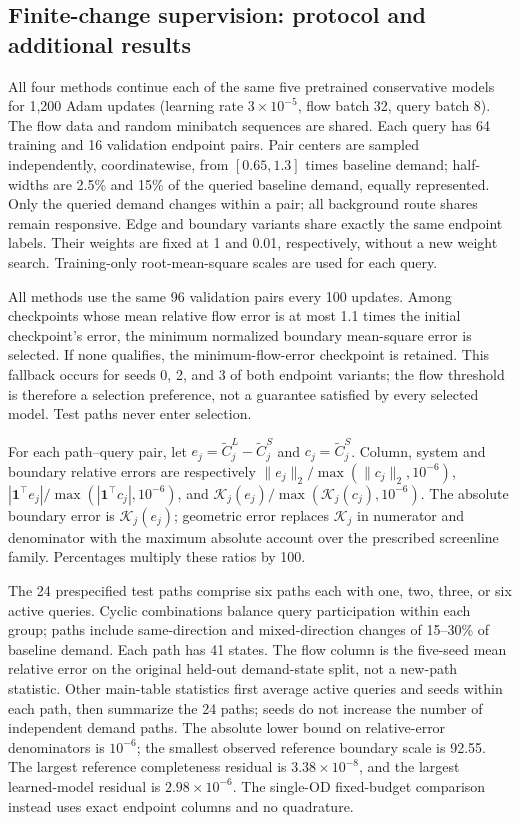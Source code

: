 \subsection{Finite-change supervision: protocol and additional results}\label{app:pairs-v102}
All four methods continue each of the same five pretrained conservative models for 1,200 Adam updates (learning rate $3\times10^{-5}$, flow batch 32, query batch 8). The flow data and random minibatch sequences are shared. Each query has 64 training and 16 validation endpoint pairs. Pair centers are sampled independently, coordinatewise, from $[0.65,1.3]$ times baseline demand; half-widths are 2.5\% and 15\% of the queried baseline demand, equally represented. Only the queried demand changes within a pair; all background route shares remain responsive. Edge and boundary variants share exactly the same endpoint labels. Their weights are fixed at 1 and 0.01, respectively, without a new weight search. Training-only root-mean-square scales are used for each query.

All methods use the same 96 validation pairs every 100 updates. Among checkpoints whose mean relative flow error is at most 1.1 times the initial checkpoint's error, the minimum normalized boundary mean-square error is selected. If none qualifies, the minimum-flow-error checkpoint is retained. This fallback occurs for seeds 0, 2, and 3 of both endpoint variants; the flow threshold is therefore a selection preference, not a guarantee satisfied by every selected model. Test paths never enter selection.

For each path--query pair, let $e_j=\widetilde C_j^L-\widetilde C_j^S$ and $c_j=\widetilde C_j^S$. Column, system and boundary relative errors are respectively $\|e_j\|_2/\max(\|c_j\|_2,10^{-6})$, $|\mathbf1^\top e_j|/\max(|\mathbf1^\top c_j|,10^{-6})$, and $\mathcal K_j(e_j)/\max(\mathcal K_j(c_j),10^{-6})$. The absolute boundary error is $\mathcal K_j(e_j)$; geometric error replaces $\mathcal K_j$ in numerator and denominator with the maximum absolute account over the prescribed screenline family. Percentages multiply these ratios by 100.

The 24 prespecified test paths comprise six paths each with one, two, three, or six active queries. Cyclic combinations balance query participation within each group; paths include same-direction and mixed-direction changes of 15--30\% of baseline demand. Each path has 41 states. The flow column is the five-seed mean relative error on the original held-out demand-state split, not a new-path statistic. Other main-table statistics first average active queries and seeds within each path, then summarize the 24 paths; seeds do not increase the number of independent demand paths. The absolute lower bound on relative-error denominators is $10^{-6}$; the smallest observed reference boundary scale is 92.55. The largest reference completeness residual is $3.38\times10^{-8}$, and the largest learned-model residual is $2.98\times10^{-6}$. The single-OD fixed-budget comparison instead uses exact endpoint columns and no quadrature.



